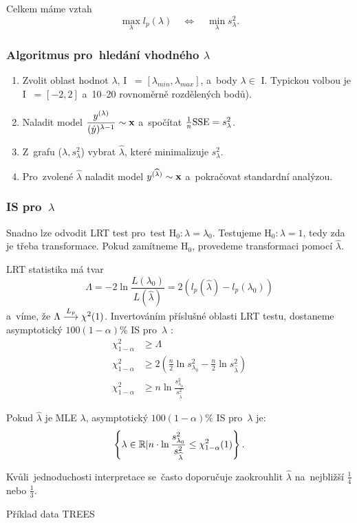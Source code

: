 Celkem máme vztah
$$ \max_{\lambda} l_p(\lambda) \quad \Leftrightarrow \quad \min_{\lambda} s_{\lambda}^2.$$

\subsubsection{Algoritmus pro~hledání vhodného $\lambda$}
\begin{enumerate}
\item Zvolit oblast hodnot $\lambda$, I~ = $[\lambda_{min}, \lambda_{max}]$, a~body $\lambda \in$ I. Typickou volbou je I~ = $[-2,2]$ a~10--20 rovnoměrně rozdělených bodů).
\item Naladit model $\dfrac{y^{(\lambda)}}{(\dot{y})^{\lambda-1}} \sim \mathbf{x}$ a~spočítat $\frac{1}{n}\mathrm{SSE} = s_{\lambda}^2$.
\item Z~grafu ($\lambda, s_{\lambda}^2$) vybrat $\widehat{\lambda}$, které minimalizuje $s_{\lambda}^2$.
\item Pro~zvolené $\widehat{\lambda}$ naladit model $y^{(\widehat{\lambda})} \sim \mathbf{x}$ a~pokračovat standardní analýzou.
\end{enumerate}

\subsubsection{IS pro~$\lambda$ }
Snadno lze odvodit LRT test pro~test $\text{H}_0 : \lambda = \lambda_0$. Testujeme $\text{H}_0 : \lambda = 1$, tedy zda je třeba transformace. Pokud zamítneme $\text{H}_0$, provedeme transformaci pomocí $\widehat{\lambda}$.

LRT statistika má tvar $$\Lambda = -2 \ln \frac{L(\lambda_0)}{L(\widehat{\lambda})} = 2 \left(l_p(\widehat{\lambda}) - l_p(\lambda_0)\right)$$ a~víme, že $\Lambda \stackrel{L_p}{\longrightarrow} \chi^2(1)$. Invertováním příslušné oblasti LRT testu, dostaneme asymptotický $100(1-\alpha)\%$ IS pro~$\lambda$ :
\begin{align*}
 \chi^2_{1-\alpha} & \geq \Lambda \\
\chi^2_{1-\alpha} & \geq 2\left(\frac{n}{2}\ln s^2_{\lambda_0} - \frac{n}{2}\ln s^2_{\widehat{\lambda}}\right) \\
\chi^2_{1-\alpha} & \geq n \ln\frac{s^2_{\lambda_0}}{s^2_{\widehat{\lambda}}}
\end{align*}

Pokud $\widehat{\lambda}$ je MLE $\lambda$, asymptotický $100(1-\alpha)\%$ IS  pro~$\lambda$ je:
 $$
 \left\{ \lambda \in \mathbb{R} | n \cdot \ln\frac{s^2_{\lambda_0}}{s^2_{\widehat{\lambda}}} \leq \chi^2_{1-\alpha}(1) \right\}.
 $$
\begin{remark}
 Kvůli~jednoduchosti interpretace se~často doporučuje zaokrouhlit $\widehat{\lambda}$ na~nejbližší $\frac{1}{4}$ nebo $\frac{1}{3}$.
\end{remark}
\begin{example}
Příklad data TREES
\end{example}

